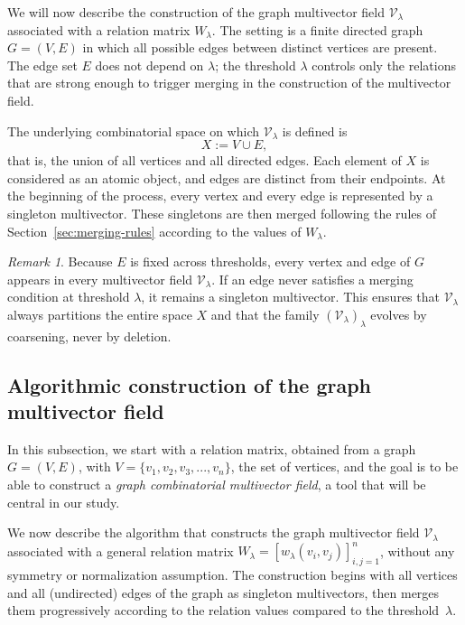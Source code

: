 \documentclass{article}
\theoremstyle{definition}
\theoremstyle{plain}
\theoremstyle{remark}
\newtheorem{remark}{Remark}
\newcommand{\1}{\mathbbm{1}}  %
\begin{document}
We will now describe the construction of the graph multivector field
$\mathcal V_\lambda$ associated with a relation matrix $W_\lambda$.
The setting is a finite directed graph
$G=(V,E)$ in which all possible edges between distinct vertices are present.
The edge set $E$ does not depend on $\lambda$; the threshold $\lambda$
controls only the relations that are strong enough to trigger merging in
the construction of the multivector field.

\medskip
\noindent
The underlying combinatorial space on which $\mathcal V_\lambda$ is defined is
\[
X := V \cup E,
\]
that is, the union of all vertices and all directed edges.
Each element of $X$ is considered as an atomic object, and edges are distinct
from their endpoints.  At the beginning of the process, every vertex and every
edge is represented by a singleton multivector.  These singletons are then
merged following the rules of Section~\ref{sec:merging-rules} according to the
values of $W_\lambda$.

\begin{remark}
\label{rem:initial_partition}
Because $E$ is fixed across thresholds, every vertex and edge of $G$ appears
in every multivector field $\mathcal V_\lambda$.  If an edge never satisfies a
merging condition at threshold $\lambda$, it remains a singleton multivector.
This ensures that $\mathcal V_\lambda$ always partitions the entire space $X$
and that the family $(\mathcal V_\lambda)_\lambda$ evolves by coarsening,
never by deletion.
\end{remark} 







\subsection{Algorithmic construction of the graph multivector field}
\label{sec:algorithm}
In this subsection, we start with a relation matrix, obtained from a graph $G=(V,E)$, with $V=\{v_1,v_2,v_3,...,v_n\}$, the set of vertices, and the goal is to be able to construct a \emph{ graph combinatorial multivector field}, a tool that will be central in our study.

We now describe the algorithm that constructs the graph multivector field
$\mathcal V_\lambda$ associated with a general relation matrix
$W_\lambda = [w_\lambda(v_i,v_j)]_{i,j=1}^n$, without any symmetry or
normalization assumption.  
The construction begins with all vertices and all (undirected) edges of the
graph as singleton multivectors, then merges them progressively according to
the relation values compared to the threshold~$\lambda$.
\end{document}
